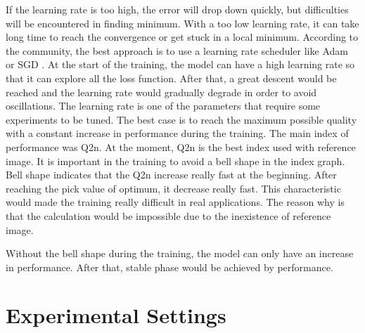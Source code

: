 \documentclass[12pt]{report}
\begin{document}
If the learning rate is too high, the error will drop down quickly, but difficulties will be encountered in finding minimum.
With a too low learning rate, it can take long time to reach the convergence or get stuck in a local minimum.
According to the community, the best approach is to use a learning rate scheduler like Adam \cite{adam} or SGD \cite{sgd}.
At the start of the training, the model can have a high learning rate so that it can explore all the loss function.
After that, a great descent would be reached and the learning rate would gradually degrade in order to avoid oscillations.
The learning rate is one of the parameters that require some experiments to be tuned.
The best case is to reach the maximum possible quality with a constant increase in performance during the training.
The main index of performance was Q2n. At the moment, Q2n is the best index used with reference image.
It is important in the training to avoid a bell shape in the index graph. Bell shape indicates that the Q2n increase really fast at the beginning.
After reaching the pick value of optimum, it decrease really fast. 
This characteristic would made the training really difficult in real applications.
The reason why is that the calculation would be impossible due to the inexistence of reference image.

Without the bell shape during the training, the model can only have an increase in performance.
After that, stable phase would be achieved by performance.


\section{Experimental Settings}
\end{document}
